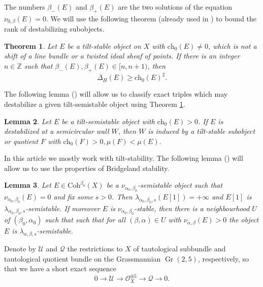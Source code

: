 \documentclass{amsart}
\def\Gr{\mathop{\mathrm{Gr}}\nolimits}
\newtheorem{theorem}{Theorem}[section]
\newtheorem{lemma}[theorem]{Lemma}
\begin{document}
	The numbers $\beta_-(E)$ and $\beta_+(E)$ are the two solutions of the equation $\nu_{0,\beta}(E)=0$. We will use the following theorem (already used in \cite[Theorem 2.8]{Vass}) to bound the rank of destabilizing subobjects.
	
	\begin{theorem}\label{rank bound}Let $E$ be a tilt-stable object on $X$ with $\mathrm{ch}_0(E)\neq 0$, which is not a shift of a line bundle or a twisted ideal sheaf of points. If there is an integer $n\in\mathbb Z$ such that $\beta_-(E),\beta_+(E)\in[n,n+1)$, then
		$$\overline{\Delta}_H(E)\ge\mathrm{ch}_0(E)^2.$$
	\end{theorem}
	
	The following lemma (\cite[Lemma 2.9]{Vass}) will allow us to classify exact triples which may destabilize a given tilt-semistable object using Theorem \ref{rank bound}.
	
	\begin{lemma}\label{stable}Let $E$ be a tilt-semistable object with $\mathrm{ch}_0(E)>0$. If $E$ is destabilized at a semicircular wall $W$, then $W$ is induced by a tilt-stable subobject or quotient $F$ with $\mathrm{ch}_0(F)>0,\mu(F)<\mu(E).$
	\end{lemma}
	
	In this article we mostly work with tilt-stability. The following lemma (\cite[Lemma 2.10]{Vass}) will allow us to use the properties of Bridgeland stability.
	
	\begin{lemma}\label{nu-lambda}
		Let $E\in\mathrm{Coh}^{\beta_0}(X)$ be a $\nu_{\alpha_0,\beta_0}$-semistable object such that $\nu_{\alpha_0,\beta_0}(E)=0$ and fix some $s>0$. Then $\lambda_{{\alpha_0},{\beta_0},s}(E[1])=+\infty$ and $E[1]$ is $\lambda_{{\alpha_0},{\beta_0},s}
		$-semistable. If moreover $E$ is $\nu_{\alpha_0,\beta_0}$-stable, then there is a neighbourhood $U$ of $(\beta_0,\alpha_0)$ such that such that for all $(\beta,\alpha)\in U$ with $\nu_{\alpha,\beta}(E)
		>0$ the object $E$ is $\lambda_{\alpha,\beta,s}$-semistable.
	\end{lemma}
	
	Denote by $\mathcal U$ and $\mathcal Q$ the restrictions to $X$ of tautological subbundle and tautological quotient bundle on the Grassmannian $\Gr(2,5)$, respectively, so that we have a short exact sequence
	\begin{equation}\label{tautological}0\to\mathcal U\to \mathcal O_{X}^{\oplus 5}\to\mathcal Q\to 0.\end{equation}
	
\end{document}
